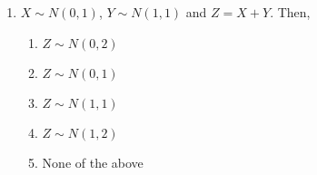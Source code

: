 \documentclass{article}
\begin{document}
\begin{enumerate}
\item $X\sim N(0,1)$, $Y\sim N(1,1)$ and $Z=X+Y$. Then,
    \begin{enumerate}
        \item $Z\sim N(0,2)$
        \item $Z\sim N(0,1)$
        \item $Z\sim N(1,1)$
        \item $Z\sim N(1,2)$
        \item None of the above
    \end{enumerate}

\end{enumerate}
\end{document}
